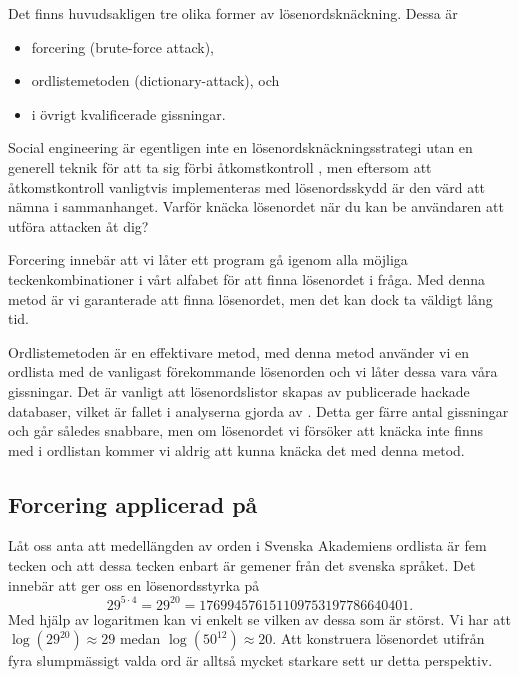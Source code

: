 \documentclass[a4paper]{article}
\theoremstyle{definition}
\theoremstyle{remark}
\begin{document}
Det finns huvudsakligen tre olika former av lösenordsknäckning.
Dessa är
\begin{itemize}
  \item forcering (brute-force attack),
  \item ordlistemetoden (dictionary-attack), och
  \item i övrigt kvalificerade gissningar.
\end{itemize}
\foreignlanguage{english}{Social engineering} är egentligen inte en 
lösenordsknäckningsstrategi utan en generell teknik för att ta sig förbi 
åtkomstkontroll \citep[s. 18]{Anderson2008sea}, men eftersom att 
åtkomstkontroll vanligtvis implementeras med lösenordsskydd är den värd att 
nämna i sammanhanget.
Varför knäcka lösenordet när du kan be användaren att utföra attacken åt dig?

Forcering innebär att vi låter ett program gå igenom alla möjliga 
teckenkombinationer i vårt alfabet för att finna lösenordet i fråga.
Med denna metod är vi garanterade att finna lösenordet, men det kan dock ta 
väldigt lång tid.

Ordlistemetoden är en effektivare metod, med denna metod använder vi en 
ordlista med de vanligast förekommande lösenorden och vi låter dessa vara våra 
gissningar.
Det är vanligt att lösenordslistor skapas av publicerade hackade databaser, 
vilket är fallet i analyserna gjorda av 
\citet{Cubrilovic2009rhf,Oberheide2010bao,Hunt2011abs,Cluley2012twp}.
Detta ger färre antal gissningar och går således snabbare, men om lösenordet vi 
försöker att knäcka inte finns med i ordlistan kommer vi aldrig att kunna 
knäcka det med denna metod.


\subsection{Forcering applicerad på }

Låt oss anta att medellängden av orden i Svenska Akademiens ordlista är fem 
tecken och att dessa tecken enbart är gemener från det svenska språket.
Det innebär att  ger oss en lösenordsstyrka på
\begin{equation}\label{eq:AntalUtfallTecken}
  29^{5\cdot 4} = 29^{20} = 176994576151109753197786640401.
\end{equation}
Med hjälp av logaritmen kan vi enkelt se vilken av dessa som är störst.
Vi har att \(\log(29^{20}) \approx 29\) medan \(\log(50^{12}) \approx 20.\)
Att konstruera lösenordet utifrån fyra slumpmässigt valda ord är alltså mycket 
starkare sett ur detta perspektiv.
\end{document}
